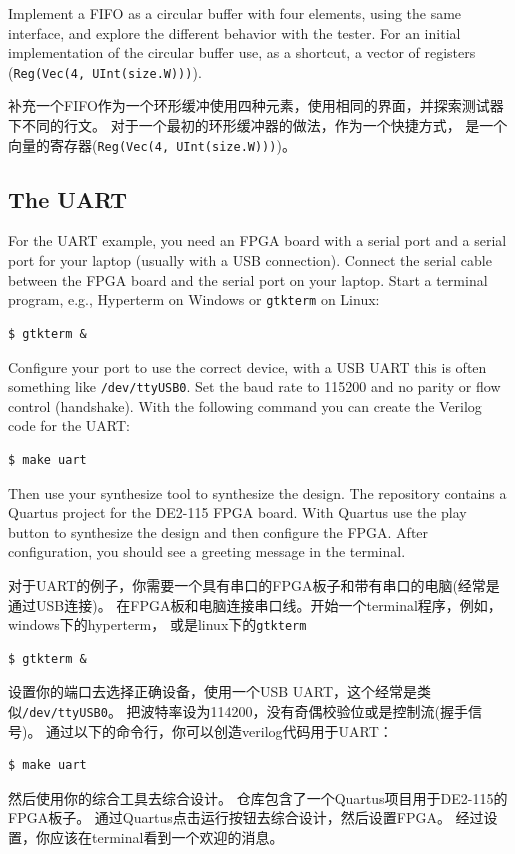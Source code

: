 \documentclass[%
    10pt,
    headinclude, footexclude,
    openright, %
    notitlepage,
    cleardoubleempty,
    headsepline,
    pointlessnumbers,
    bibtotoc, idxtotoc,
    ]{scrbook}
\newcommand{\code}[1]{{\small{\texttt{#1}}}}
\begin{document}
Implement a FIFO as a circular buffer with four elements, using the same
interface, and explore the different behavior with the tester.
For an initial implementation of the circular buffer use, as a shortcut,
a vector of registers (\code{Reg(Vec(4, UInt(size.W)))}).

补充一个FIFO作为一个环形缓冲使用四种元素，使用相同的界面，并探索测试器下不同的行文。
对于一个最初的环形缓冲器的做法，作为一个快捷方式，
是一个向量的寄存器(\code{Reg(Vec(4, UInt(size.W)))})。

\subsection{The UART}

For the UART example, you need an FPGA board with a serial port and
a serial port for your laptop (usually with a USB connection).
Connect the serial cable between the FPGA board and the serial port on
your laptop. Start a terminal program, e.g., Hyperterm on Windows
or \code{gtkterm} on Linux:
\begin{verbatim}
$ gtkterm &
\end{verbatim}
Configure your port to use the correct device, with a USB UART this
is often something like \code{/dev/ttyUSB0}. Set the baud rate to 115200
and no parity or flow control (handshake).
With the following command you can create the Verilog code for the UART:
\begin{verbatim}
$ make uart
\end{verbatim}
Then use your synthesize tool to synthesize the design.
The repository contains a Quartus project for the DE2-115 FPGA board.
With Quartus use the play button to synthesize the design and then configure
the FPGA.
After configuration, you should see a greeting message in the terminal.

对于UART的例子，你需要一个具有串口的FPGA板子和带有串口的电脑(经常是通过USB连接)。
在FPGA板和电脑连接串口线。开始一个terminal程序，例如，windows下的hyperterm，
或是linux下的\code{gtkterm}
\begin{verbatim}
$ gtkterm &
\end{verbatim}
设置你的端口去选择正确设备，使用一个USB UART，这个经常是类似\code{/dev/ttyUSB0}。
把波特率设为114200，没有奇偶校验位或是控制流(握手信号)。
通过以下的命令行，你可以创造verilog代码用于UART：
\begin{verbatim}
$ make uart
\end{verbatim}
然后使用你的综合工具去综合设计。
仓库包含了一个Quartus项目用于DE2-115的FPGA板子。
通过Quartus点击运行按钮去综合设计，然后设置FPGA。
经过设置，你应该在terminal看到一个欢迎的消息。
\end{document}
